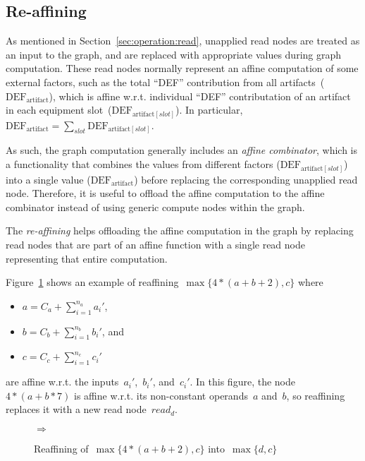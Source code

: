 \documentclass{article}
\DeclareMathOperator{\readNode}{read}
\begin{document}
\subsection{Re-affining}

As mentioned in Section~\ref{sec:operation:read}, unapplied read nodes are treated as an input to the graph, and are replaced with appropriate values during graph computation.
These read nodes normally represent an affine computation of some external factors, such as the total ``DEF'' contribution from all artifacts~($\text{DEF}_\text{artifact}$), which is affine w.r.t. individual ``DEF'' contributation of an artifact in each equipment slot~($\text{DEF}_{\text{artifact}[slot]}$).
In particular, $\text{DEF}_\text{artifact} = \sum_{slot} \text{DEF}_{\text{artifact}[slot]}$.

As such, the graph computation generally includes an \emph{affine combinator}, which is a functionality that combines the values from different factors ($\text{DEF}_{\text{artifact}[slot]}$) into a single value ($\text{DEF}_\text{artifact}$) before replacing the corresponding unapplied read node.
Therefore, it is useful to offload the affine computation to the affine combinator instead of using generic compute nodes within the graph.

The \emph{re-affining} helps offloading the affine computation in the graph by replacing read nodes that are part of an affine function with a single read node representing that entire computation.

Figure~\ref{fig:optimization:reaffine} shows an example of reaffining~$\max\{4 * (a + b + 2), c\}$ where
\begin{itemize}
	\item $a=C_a + \sum_{i=1}^{n_a}a_i'$,
	\item $b=C_b + \sum_{i=1}^{n_b}b_i'$, and
	\item $c=C_c + \sum_{i=1}^{n_c}c_i'$
\end{itemize}
are affine w.r.t. the inputs~${a_i'}$,~$b_i'$, and~$c_i'$.
In this figure, the node~$4 * (a + b * 7)$ is affine w.r.t. its non-constant operands~$a$ and~$b$, so reaffining replaces it with a new read node~$read_d$.
%
\begin{figure}
	\centering
	\quad$\Rightarrow$\quad
	\caption{Reaffining of~$\max\{4 * (a + b + 2), c\}$ into~$\max\{d, c\}$}
	\label{fig:optimization:reaffine}
\end{figure}
\end{document}
